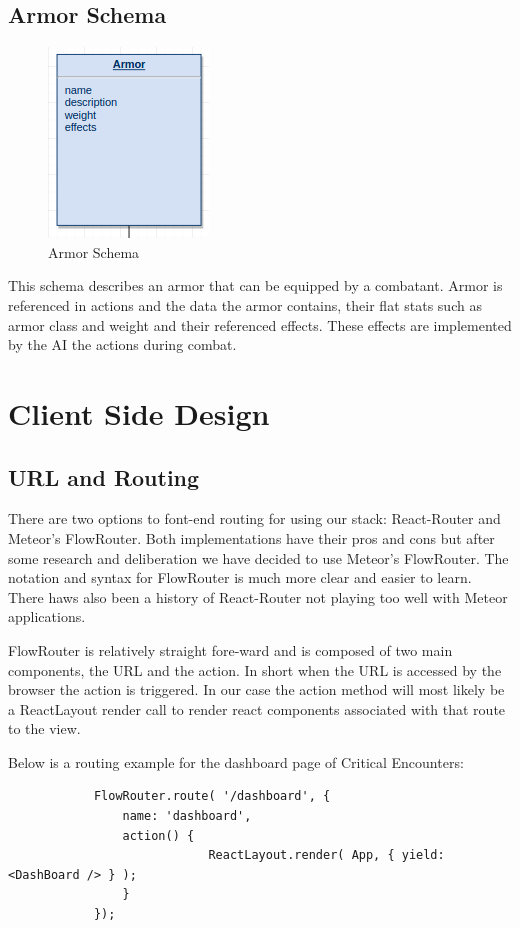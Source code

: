 \documentclass[12pt,a4paper]{report}
\begin{document}
\subsection {Armor Schema}
\begin{figure}[H]
	\centering
	\includegraphics[scale=.9]{schema-armor}
	\caption{Armor Schema}
	\label{fig: Armor Schema }
\end{figure}
This schema describes an armor that can be equipped by a combatant. Armor is referenced in actions and the data the armor contains, their flat stats such as armor class and weight and their referenced effects. These effects are implemented by the AI the actions during combat.
\newpage
\section{Client Side Design}

	\subsection{URL and Routing}
		There are two options to font-end routing for using our stack: React-Router and Meteor's FlowRouter. Both implementations have their pros and cons but after some research and deliberation we have decided to use Meteor's FlowRouter. The notation and syntax for FlowRouter is much more clear and easier to learn. There haws also been a history of React-Router not playing too well with Meteor applications. 
		
		FlowRouter is relatively straight fore-ward and is composed of two main components, the URL and the action. In short when the URL is accessed by the browser the action is triggered. In our case the action method will most likely be a ReactLayout render call to render react components associated with that route to the view.
		
		Below is a routing example for the dashboard page of Critical Encounters:
		
		\begin{lstlisting}
			FlowRouter.route( '/dashboard', {
				name: 'dashboard',
				action() {
							ReactLayout.render( App, { yield: <DashBoard /> } );
				}
			});
		\end{lstlisting}
		
\end{document}

